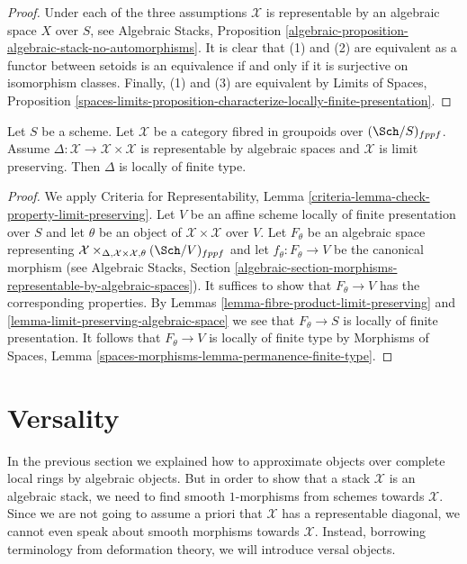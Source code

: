 \begin{proof}
Under each of the three assumptions $\mathcal{X}$ is representable
by an algebraic space $X$ over $S$, see Algebraic Stacks, Proposition
\ref{algebraic-proposition-algebraic-stack-no-automorphisms}.
It is clear that (1) and (2) are equivalent as a functor between
setoids is an equivalence if and only if it is surjective on isomorphism
classes. Finally, (1) and (3) are equivalent by
Limits of Spaces, Proposition
\ref{spaces-limits-proposition-characterize-locally-finite-presentation}.
\end{proof}

\begin{lemma}
\label{lemma-diagonal}
Let $S$ be a scheme. Let $\mathcal{X}$ be a category fibred
in groupoids over $(\Sch/S)_{fppf}$. Assume
$\Delta : \mathcal{X} \to \mathcal{X} \times \mathcal{X}$ is
representable by algebraic spaces and $\mathcal{X}$ is limit preserving.
Then $\Delta$ is locally of finite type.
\end{lemma}

\begin{proof}
We apply Criteria for Representability, Lemma
\ref{criteria-lemma-check-property-limit-preserving}.
Let $V$ be an affine scheme locally of finite presentation over $S$
and let $\theta$ be an object of $\mathcal{X} \times \mathcal{X}$
over $V$. Let $F_\theta$ be an algebraic space representing
$\mathcal{X} \times_{\Delta, \mathcal{X} \times \mathcal{X}, \theta}
(\Sch/V)_{fppf}$ and let $f_\theta : F_\theta \to V$ be the canonical morphism
(see Algebraic Stacks, Section
\ref{algebraic-section-morphisms-representable-by-algebraic-spaces}).
It suffices to show that
$F_\theta \to V$ has the corresponding properties. By
Lemmas \ref{lemma-fibre-product-limit-preserving} and
\ref{lemma-limit-preserving-algebraic-space}
we see that $F_\theta \to S$ is locally of finite presentation.
It follows that $F_\theta \to V$ is locally of finite type
by Morphisms of Spaces, Lemma
\ref{spaces-morphisms-lemma-permanence-finite-type}.
\end{proof}






\section{Versality}
\label{section-versality}

\noindent
In the previous section we explained how to approximate objects over
complete local rings by algebraic objects. But in order to show that
a stack $\mathcal{X}$ is an algebraic stack, we need to find smooth
$1$-morphisms from schemes towards $\mathcal{X}$. Since we are not going
to assume a priori that $\mathcal{X}$ has a representable diagonal, we
cannot even speak about smooth morphisms towards $\mathcal{X}$. Instead,
borrowing terminology from deformation theory, we will introduce versal
objects.

